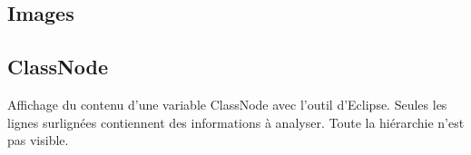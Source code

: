 \documentclass[french,a4paper,12pt]{report}
\begin{document}
\begin{appendices}
\chapter*{Images}

\section*{ClassNode}

Affichage du contenu d'une variable ClassNode avec l'outil d'Eclipse. Seules les lignes surlignées contiennent des informations à analyser. Toute la hiérarchie n'est pas visible.

\label{ClassNode}

\begin{center}

\end{center}
\end{appendices}
\end{document}
